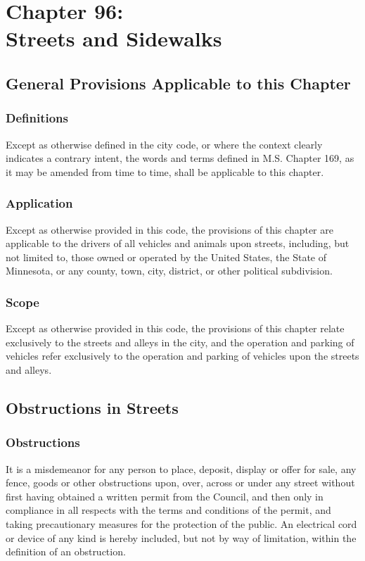 \chapter*{Chapter 96: \\
	Streets and Sidewalks}
    \vfill
    \minitoc
    \pagebreak

\section{General Provisions Applicable to this Chapter}
\subsection{Definitions}
Except as otherwise defined in the city code, or where the context clearly indicates a contrary intent, the words and terms defined in M.S. Chapter 169, as it may be amended from time to time, shall be applicable to this chapter.
\subsection{Application}
Except as otherwise provided in this code, the provisions of this chapter are applicable to the drivers of all vehicles and animals upon streets, including, but not limited to, those owned or operated by the United States, the State of Minnesota, or any county, town, city, district, or other political subdivision.
\subsection{Scope}
Except as otherwise provided in this code, the provisions of this chapter relate exclusively to the streets and alleys in the city, and the operation and parking of vehicles refer exclusively to the operation and parking of vehicles upon the streets and alleys.

\section{Obstructions in Streets}
\subsection{Obstructions}
It is a misdemeanor for any person to place, deposit, display or offer for sale, any fence, goods or other obstructions upon, over, across or under any street without first having obtained a written permit from the Council, and then only in compliance in all respects with the terms and conditions of the permit, and taking precautionary measures for the protection of the public.  An electrical cord or device of any kind is hereby included, but not by way of limitation, within the definition of an obstruction.
